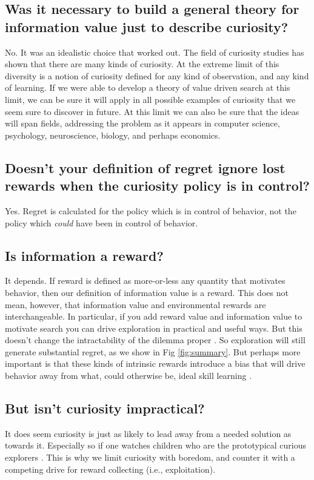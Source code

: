 \subsection*{Was it necessary to build a general theory for information value just to describe curiosity?}
No. It was an idealistic choice that worked out. The field of curiosity studies has shown that there are many kinds of curiosity. At the extreme limit of this diversity is a notion of curiosity defined for any kind of observation, and any kind of learning. If we were able to develop a theory of value driven search at this limit, we can be sure it will apply in all possible examples of curiosity that we seem sure to discover in future. At this limit we can also be sure that the ideas will span fields, addressing the problem as it appears in computer science, psychology, neuroscience, biology, and perhaps economics.


\subsection*{Doesn't your definition of regret ignore lost rewards when the curiosity policy is in control?}
Yes. Regret is calculated for the policy which is in control of behavior, not the policy which \textit{could} have been in control of behavior.


\subsection*{Is information a reward?}
It depends. If reward is defined as more-or-less any quantity that motivates behavior, then our definition of information value is a reward. This does not mean, however, that information value and environmental rewards are interchangeable. In particular, if you add reward value and information value to motivate search you can drive exploration in practical and useful ways. But this doesn't change the intractability of the dilemma proper \citep{Thrun1992a,Dayan1996,Findling2018,Gershman2018b}. So exploration will still generate substantial regret, as we show in Fig \ref{fig:summary}. But perhaps more important is that these kinds of intrinsic rewards \citep{Schmidhuber1991,Berger-Tal2014,Itti2009,Kobayashi2019} introduce a bias that will drive behavior away from what, could otherwise be, ideal skill learning \citep{Ng1999,Simsek2006}.


\subsection*{But isn't curiosity impractical?}
It does seem curiosity is just as likely to lead away from a needed solution as towards it. Especially so if one watches children who are the prototypical curious explorers \citep{Sumner2019,Kidd2015}. This is why we limit curiosity with boredom, and counter it with a competing drive for reward collecting (i.e., exploitation). 

